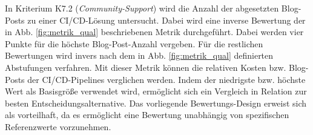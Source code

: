 \vspace*{-15mm}
In Kriterium K7.2 (\textit{Community-Support}) wird die Anzahl der abgesetzten Blog-Posts zu einer CI/CD-Lösung untersucht. Dabei wird eine inverse Bewertung der in Abb. \ref*{fig:metrik_qual} beschriebenen Metrik durchgeführt. Dabei werden vier Punkte für die höchste Blog-Post-Anzahl vergeben. Für die restlichen Bewertungen wird invers nach dem in Abb. \ref*{fig:metrik_qual} definierten Abstufungen verfahren. Mit dieser Metrik können die relativen Kosten bzw. Blog-Posts der CI/CD-Pipelines verglichen werden. Indem der niedrigste bzw. höchste Wert als Basisgröße verwendet wird, ermöglicht sich ein Vergleich in Relation zur besten Entscheidungsalternative. Das vorliegende Bewertungs-Design erweist sich als vorteilhaft, da es ermöglicht eine Bewertung unabhängig von spezifischen Referenzwerte vorzunehmen.

